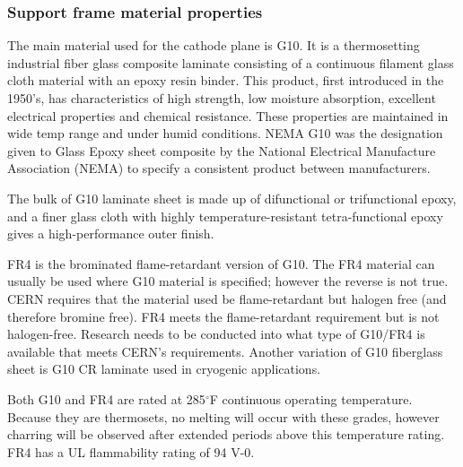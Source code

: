 \subsubsection{Support frame material properties}

The main material used for the cathode plane is G10. It is a thermosetting industrial fiber glass composite laminate consisting of a continuous filament glass cloth material with an epoxy resin binder. This product, first introduced in the 1950's, has characteristics of high strength, low moisture absorption, excellent electrical properties  and chemical resistance. These properties are maintained in wide temp range and under humid conditions.
NEMA G10 was the designation given to Glass Epoxy sheet composite by the National Electrical Manufacture Association (NEMA) to specify a consistent product between manufacturers. 



The bulk of G10 laminate sheet is made up of difunctional or trifunctional epoxy, and a finer glass cloth with highly temperature-resistant tetra-functional epoxy gives a high-performance outer finish. 

FR4 is the brominated flame-retardant version of G10. The FR4 material can usually be used where G10 material is specified; however %
the reverse is not true. CERN requires that the material used be flame-retardant but halogen free (and therefore bromine free).  FR4 meets the flame-retardant requirement but %
is not halogen-free. Research needs to be conducted into what type of G10/FR4 is available that meets CERN's requirements.
Another variation of G10 fiberglass sheet is G10 CR laminate used in cryogenic applications. 

Both G10 and FR4 are rated at 285$^\circ$F continuous operating temperature. Because they are thermosets, no melting will occur with these grades, however charring will be observed after extended periods above this temperature rating. FR4 has a UL flammability rating of 94 V-0.

